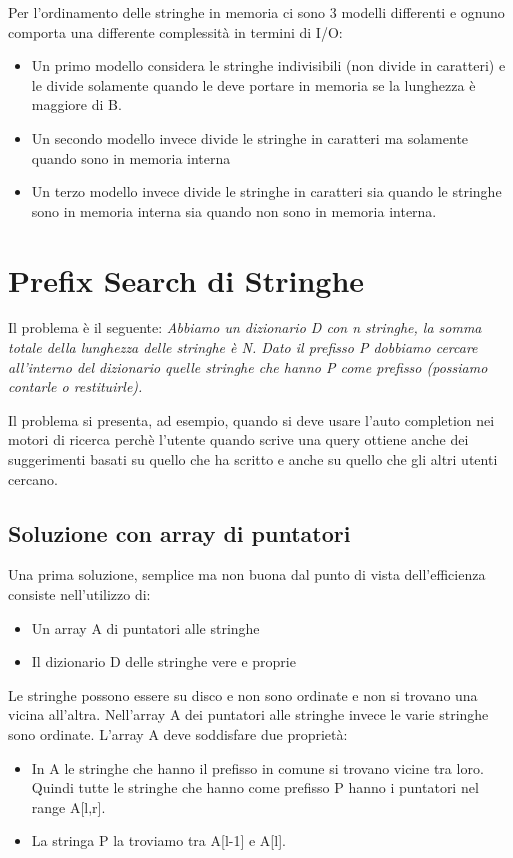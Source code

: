 \documentclass[14pt]{extreport}
\begin{document}
Per l'ordinamento delle stringhe in memoria ci sono 3 modelli differenti e ognuno comporta una differente complessità in termini di I/O:

\begin{itemize}
\item Un primo modello considera le stringhe indivisibili (non divide in caratteri) e le divide solamente quando le deve portare in memoria se la lunghezza è maggiore di B.
\item Un secondo modello invece divide le stringhe in caratteri ma solamente quando sono in memoria interna
\item Un terzo modello invece divide le stringhe in caratteri sia quando le stringhe sono in memoria interna sia quando non sono in memoria interna.
\end{itemize}




\chapter{Prefix Search di Stringhe}

Il problema è il seguente:
\newline
\textit{Abbiamo un dizionario D con n stringhe, la somma totale della lunghezza delle stringhe è N. Dato il prefisso P dobbiamo cercare all'interno del dizionario quelle stringhe che hanno P come prefisso (possiamo contarle o restituirle).}

Il problema si presenta, ad esempio, quando si deve usare l'auto completion nei motori di ricerca perchè l'utente quando scrive una query ottiene anche dei suggerimenti basati su quello che ha scritto e anche su quello che gli altri utenti cercano.

\section{Soluzione con array di puntatori}

Una prima soluzione, semplice ma non buona dal punto di vista dell'efficienza consiste nell'utilizzo di:
\begin{itemize}
\item Un array A di puntatori alle stringhe
\item Il dizionario D delle stringhe vere e proprie
\end{itemize}

Le stringhe possono essere su disco e non sono ordinate e non si trovano una vicina all'altra. Nell'array A dei puntatori alle stringhe invece le varie stringhe sono ordinate.
L'array A deve soddisfare due proprietà:
\begin{itemize}
    \item In A le stringhe che hanno il prefisso in comune si trovano vicine tra loro. Quindi tutte le stringhe che hanno come prefisso P hanno i puntatori nel range A[l,r].
    \item La stringa P la troviamo tra A[l-1] e A[l].
\end{itemize}
\end{document}
